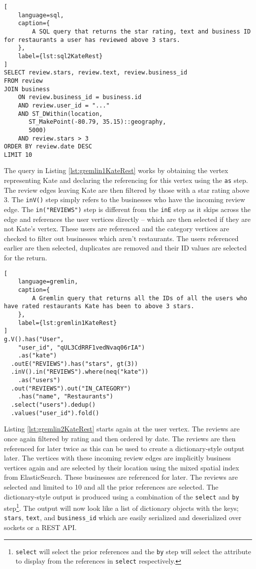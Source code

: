 \begin{lstlisting}[
    language=sql,
    caption={
        A SQL query that returns the star rating, text and business ID for restaurants a user has reviewed above 3 stars.
    },
    label={lst:sql2KateRest}
]
SELECT review.stars, review.text, review.business_id
FROM review
JOIN business
    ON review.business_id = business.id
    AND review.user_id = "..."
    AND ST_DWithin(location,
       ST_MakePoint(-80.79, 35.15)::geography,
       5000)
    AND review.stars > 3
ORDER BY review.date DESC
LIMIT 10
\end{lstlisting}



The query in Listing \ref{lst:gremlin1KateRest} works by obtaining the vertex representing Kate and declaring the referencing for this vertex using the \texttt{as} step. The review edges leaving Kate are then filtered by those with a star rating above 3. The \texttt{inV()} step simply refers to the businesses who have the incoming review edge. The \texttt{in("REVIEWS")} step is different from the \texttt{inE} step as it skips across the edge and references the user vertices directly -- which are then selected if they are not Kate's vertex. These users are referenced and the category vertices are checked to filter out businesses which aren't restaurants. The users referenced earlier are then selected, duplicates are removed and their ID values are selected for the return.

\begin{lstlisting}[
    language=gremlin,
    caption={
        A Gremlin query that returns all the IDs of all the users who have rated restaurants Kate has been to above 3 stars.
    },
    label={lst:gremlin1KateRest}
]
g.V().has("User",
    "user_id", "qUL3CdRRF1vedNvaq06rIA")
    .as("kate")
  .outE("REVIEWS").has("stars", gt(3))
  .inV().in("REVIEWS").where(neq("kate"))
    .as("users")
  .out("REVIEWS").out("IN_CATEGORY")
    .has("name", "Restaurants")
  .select("users").dedup()
  .values("user_id").fold()
\end{lstlisting}

Listing \ref{lst:gremlin2KateRest} starts again at the user vertex. The reviews are once again filtered by rating and then ordered by date. The reviews are then referenced for later twice as this can be used to create a dictionary-style output later. The vertices with these incoming review edges are implicitly business vertices again and are selected by their location using the mixed spatial index from ElasticSearch. These businesses are referenced for later. The reviews are selected and limited to 10 and all the prior references are selected. The dictionary-style output is produced using a combination of the \texttt{select} and \texttt{by} step\footnote{\texttt{select} will select the prior references and the \texttt{by} step will select the attribute to display from the references in \texttt{select} respectively.}. The output will now look like a list of dictionary objects with the keys; \texttt{stars}, \texttt{text}, and \texttt{business\_id} which are easily serialized and deserialized over sockets or a REST API.

